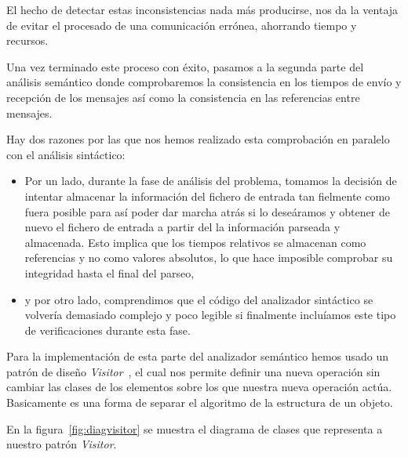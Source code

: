 El hecho de detectar estas inconsistencias nada más producirse, nos da
la ventaja de evitar el procesado de una comunicación errónea,
ahorrando tiempo y recursos.

Una vez terminado este proceso con éxito, pasamos a la segunda parte
del análisis semántico donde comprobaremos la consistencia en los
tiempos de envío y recepción de los mensajes así como la consistencia
en las referencias entre mensajes.

Hay dos razones por las que nos hemos realizado esta comprobación en
paralelo con el análisis sintáctico:
\begin{itemize}
\item Por un lado, durante la fase de análisis del problema, tomamos
  la decisión de intentar almacenar la información del fichero de
  entrada tan fielmente como fuera posible para así poder dar marcha
  atrás si lo deseáramos y obtener de nuevo el fichero de entrada a
  partir del la información parseada y almacenada. Esto implica que
  los tiempos relativos se almacenan como referencias y no como
  valores absolutos, lo que hace imposible comprobar su integridad
  hasta el final del parseo,
\item y por otro lado, comprendimos que el código del analizador
  sintáctico se volvería demasiado complejo y poco legible si
  finalmente incluíamos este tipo de verificaciones durante esta fase.
\end{itemize}

Para la implementación de esta parte del analizador semántico hemos
usado un patrón de diseño \textit{Visitor}~\cite{gof}, el cual nos permite
definir una nueva operación sin cambiar las clases de los elementos
sobre los que nuestra nueva operación actúa. Basicamente es una forma
de separar el algoritmo de la estructura de un objeto.

En la figura~\ref{fig:diagvisitor} se muestra el diagrama de clases que
representa a nuestro patrón \textit{Visitor}.

